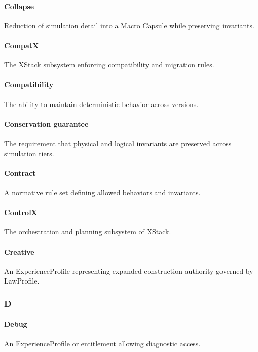 \documentclass[9pt,a4paper,openany]{book}
\begin{document}
\paragraph{Collapse}
Reduction of simulation detail into a Macro Capsule while preserving invariants.\allowbreak{}


\paragraph{CompatX}
The XStack subsystem enforcing compatibility and migration rules.\allowbreak{}


\paragraph{Compatibility}
The ability to maintain deterministic behavior across versions.\allowbreak{}


\paragraph{Conservation guarantee}
The requirement that physical and logical invariants are preserved across simulation tiers.\allowbreak{}


\paragraph{Contract}
A normative rule set defining allowed behaviors and invariants.\allowbreak{}


\paragraph{ControlX}
The orchestration and planning subsystem of XStack.\allowbreak{}


\paragraph{Creative}
An ExperienceProfile representing expanded construction authority governed by LawProfile.\allowbreak{}


\subsubsection{D}

\paragraph{Debug}
An ExperienceProfile or entitlement allowing diagnostic access.\allowbreak{}
\end{document}
